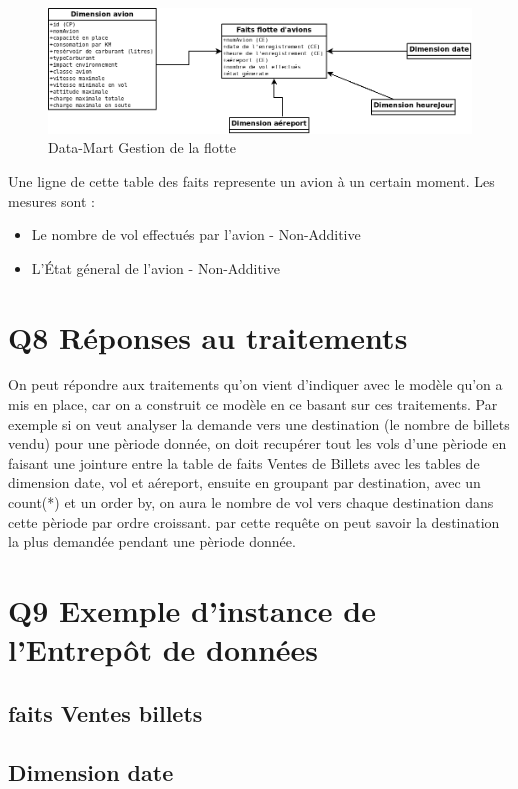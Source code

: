 \documentclass[oneside,13pt,a4paper]{article}
\begin{document}
\begin{figure}[h]
  \centering
  \includegraphics[width=1\textwidth]{img/flotteAvions.png}
  \caption{Data-Mart Gestion de la flotte}
\end{figure}

Une ligne de cette table des faits represente un avion à un certain moment. Les mesures sont :
\begin{itemize}
  \item Le nombre de vol effectués par l'avion - Non-Additive
  \item L'État géneral de l'avion - Non-Additive
\end{itemize}

\section{Q8 Réponses au traitements}

On peut répondre aux traitements qu'on vient d'indiquer avec le modèle qu'on a mis en place, car on a construit ce modèle en ce basant sur ces traitements. Par exemple si on veut analyser la demande vers une destination (le nombre de billets vendu) pour une pèriode donnée, on doit recupérer tout les vols d'une pèriode en faisant une jointure entre la table de faits Ventes de Billets avec les tables de dimension date, vol et aéreport, ensuite en groupant par destination, avec un count(*) et un order by, on aura le nombre de vol vers chaque destination dans cette pèriode par ordre croissant. par cette requête on peut savoir la destination la plus demandée pendant une pèriode donnée.

\section{Q9 Exemple d'instance de l'Entrepôt de données}

\subsection{faits Ventes billets}

\subsection{Dimension date}
\end{document}
